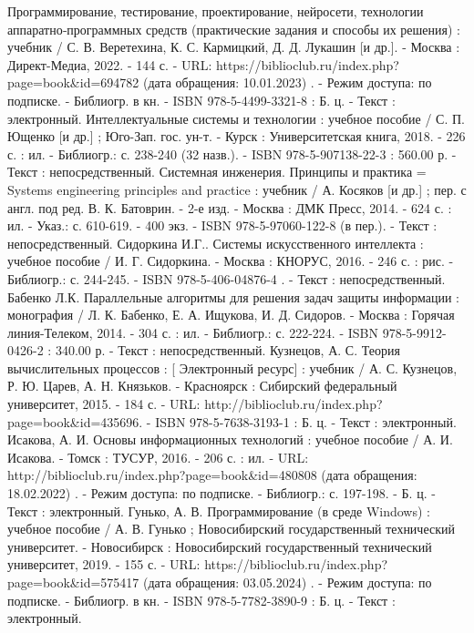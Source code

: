 \begin{thebibliography}{50}
     Программирование, тестирование, проектирование, нейросети, технологии аппаратно‐программных средств (практические задания и способы их решения) : учебник / С. В. Веретехина, К. С. Кармицкий, Д. Д. Лукашин [и др.]. - Москва : Директ-Медиа, 2022. - 144 с. - URL: https://biblioclub.ru/index.php?page=book\&id=694782 (дата обращения: 10.01.2023) . - Режим доступа: по подписке. - Библиогр. в кн. - ISBN 978-5-4499-3321-8 : Б. ц. - Текст : электронный.
     Интеллектуальные системы и технологии : учебное пособие / С. П. Ющенко [и др.] ; Юго-Зап. гос. ун-т. - Курск : Университетская книга, 2018. - 226 с. : ил. - Библиогр.: с. 238-240 (32 назв.). - ISBN 978-5-907138-22-3 : 560.00 р. - Текст : непосредственный.
    \bibitem{} Системная инженерия. Принципы и практика = Systems engineering principles and practice : учебник / А. Косяков [и др.] ; пер. с англ. под ред. В. К. Батоврин. - 2-е изд. - Москва : ДМК Пресс, 2014. - 624 с. : ил. - Указ.: с. 610-619. - 400 экз. - ISBN 978-5-97060-122-8 (в пер.). - Текст : непосредственный.
    \bibitem{} Сидоркина И.Г..   Системы искусственного интеллекта : учебное пособие / И. Г. Сидоркина. - Москва : КНОРУС, 2016. - 246 с. : рис. - Библиогр.: с. 244-245. - ISBN 978-5-406-04876-4 . - Текст : непосредственный.
    \bibitem{} Бабенко Л.К.   Параллельные алгоритмы для решения задач защиты информации : монография / Л. К. Бабенко, Е. А. Ищукова, И. Д. Сидоров. - Москва : Горячая линия-Телеком, 2014. - 304 с. : ил. - Библиогр.: с. 222-224. - ISBN 978-5-9912-0426-2 : 340.00 р. - Текст : непосредственный.
    \bibitem{} Кузнецов, А. С.    Теория вычислительных процессов : [ Электронный ресурс] : учебник / А. С. Кузнецов, Р. Ю. Царев, А. Н. Князьков. - Красноярск : Сибирский федеральный университет, 2015. - 184 с. - URL: http://biblioclub.ru/index.php?page=book\&id=435696. - ISBN 978-5-7638-3193-1 : Б. ц.  - Текст : электронный.
    \bibitem{} Исакова, А. И.    Основы информационных технологий : учебное пособие / А. И. Исакова. - Томск : ТУСУР, 2016. - 206 с. : ил. - URL: http://biblioclub.ru/index.php?page=book\&id=480808 (дата обращения: 18.02.2022) . - Режим доступа: по подписке. - Библиогр.: с. 197-198. - Б. ц. - Текст : электронный.
    \bibitem{} Гунько, А. В.    Программирование (в среде Windows) : учебное пособие / А. В. Гунько ; Новосибирский государственный технический университет. - Новосибирск : Новосибирский государственный технический университет, 2019. - 155 с. - URL: https://biblioclub.ru/index.php?page=book\&id=575417 (дата обращения: 03.05.2024) . - Режим доступа: по подписке. - Библиогр. в кн. - ISBN 978-5-7782-3890-9 : Б. ц. - Текст : электронный.

\end{thebibliography}
